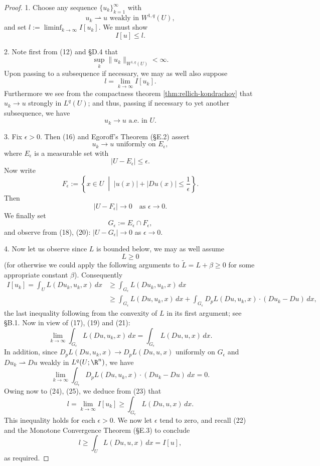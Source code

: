 \begin{proof}
1. Choose any sequence $\{u_k\}_{k=1}^\infty$ with
\[
u_k \rightharpoonup u \text{ weakly in } W^{1,q}(U),
\tag{12}
\]
and set $l := \liminf_{k \to \infty} I[u_k]$. We must show
\[
I[u] \le l.
\tag{13}
\]

2. Note first from (12) and \S D.4 that
\[
\sup_k \|u_k\|_{W^{1,q}(U)} < \infty.
\tag{14}
\]
Upon passing to a subsequence if necessary, we may as well also suppose
\[
l = \lim_{k \to \infty} I[u_k].
\tag{15}
\]
Furthermore we see from the compactness theorem \cref{thm:rellich-kondrachov} that $u_k \to u$ strongly in $L^q(U)$; and thus, passing if necessary to yet another subsequence, we have
\[
u_k \to u \text{ a.e. in } U.
\tag{16}
\]

3. Fix $\epsilon > 0$. Then (16) and Egoroff's Theorem (\S E.2) assert
\[
u_k \to u \text{ uniformly on } E_\epsilon,
\tag{17}
\]
where $E_\epsilon$ is a measurable set with
\[
|U - E_\epsilon| \le \epsilon.
\tag{18}
\]
Now write
\[
F_\epsilon := \left\{x \in U \;\middle|\; |u(x)| + |Du(x)| \le \frac{1}{\epsilon}\right\}.
\tag{19}
\]
Then
\[
|U - F_\epsilon| \to 0 \quad \text{as } \epsilon \to 0.
\tag{20}
\]
We finally set
\[
G_\epsilon := E_\epsilon \cap F_\epsilon,
\tag{21}
\]
and observe from (18), (20): $|U - G_\epsilon| \to 0$ as $\epsilon \to 0$.

4. Now let us observe since $L$ is bounded below, we may as well assume
\[
L \geq 0
\tag{22}
\]
(for otherwise we could apply the following arguments to $\tilde{L} = L + \beta \geq 0$ for some appropriate constant $\beta$). Consequently
\[
\begin{aligned}
I[u_k] = \int_U L(Du_k, u_k, x) \, dx &\geq \int_{G_\epsilon} L(Du_k, u_k, x) \, dx \\
&\geq \int_{G_\epsilon} L(Du, u_k, x) \, dx + \int_{G_\epsilon} D_p L(Du, u_k, x) \cdot (Du_k - Du) \, dx,
\end{aligned}
\tag{23}
\]
the last inequality following from the convexity of $L$ in its first argument; see \S B.1. Now in view of (17), (19) and (21):
\[
\lim_{k \to \infty} \int_{G_\epsilon} L(Du, u_k, x) \, dx = \int_{G_\epsilon} L(Du, u, x) \, dx.
\tag{24}
\]
In addition, since $D_p L(Du, u_k, x) \to D_p L(Du, u, x)$ uniformly on $G_\epsilon$ and $Du_k \rightharpoonup Du$ weakly in $L^q(U; \R^n)$, we have
\[
\lim_{k \to \infty} \int_{G_\epsilon} D_p L(Du, u_k, x) \cdot (Du_k - Du) \, dx = 0.
\tag{25}
\]
Owing now to (24), (25), we deduce from (23) that
\[
l = \lim_{k \to \infty} I[u_k] \geq \int_{G_\epsilon} L(Du, u, x) \, dx.
\]
This inequality holds for each $\epsilon > 0$. We now let $\epsilon$ tend to zero, and recall (22) and the Monotone Convergence Theorem (\S E.3) to conclude
\[
l \geq \int_U L(Du, u, x) \, dx = I[u],
\]
as required.
\end{proof}

